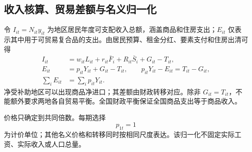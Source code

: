 \documentclass[UTF8,a4paper,zihao=-4,fontset=windows]{ctexart}
\numberwithin{equation}{section}
\begin{document}
\subsection{收入核算、贸易差额与名义归一化}
令 $I_{it}=N_{it}y_{it}$ 为地区居民年度可支配收入总额，涵盖商品和住房支出；$E_{it}$ 仅表示其中用于可贸易复合品的支出。由居民预算、租金分红、要素支付和住房出清可得
\begin{align}
  I_{it}&=w_{it}L_{it}+r_{it}\bar F_i+R_{it}\bar S_i+G_{it}-T_{it},\\
  E_{it}&=p_{it}Y_{it}+G_{it}-T_{it},\qquad
  p_{it}Y_{it}-E_{it}=T_{it}-G_{it},
  \label{eq:regional-accounting}\\
  \sum_iE_{it}&=\sum_ip_{it}Y_{it}.
  \label{eq:walras-accounting}
\end{align}
净受补助地区可以出现商品净进口；其差额由财政转移对应。除非 $G_{it}=T_{it}$，不能额外要求两地各自贸易平衡。全国财政平衡保证全国商品支出等于商品收入。

价格只确定到共同倍数。每期选择
\begin{equation}
  p_{1t}=1
  \label{eq:numeraire}
\end{equation}
为计价单位；其他名义价格和转移同时按相同尺度表达。该归一化不固定实际工资、实际收入或人口总量。
\end{document}
